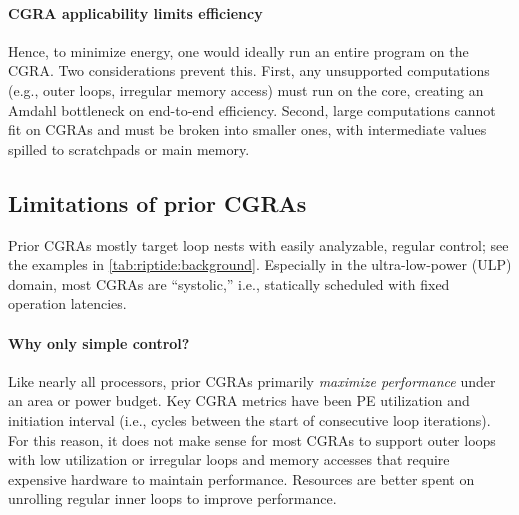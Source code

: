 
\paragraph{CGRA applicability limits efficiency}
Hence, to minimize energy, one would ideally run an entire program on the CGRA.
%
Two considerations prevent this.
%
First, any unsupported computations (e.g., outer loops, irregular memory access)
must run on the core, creating an Amdahl bottleneck on end-to-end
efficiency.
%
Second, large computations cannot fit on CGRAs and must be broken
into smaller ones, with intermediate values spilled to scratchpads or main memory.


\subsection{Limitations of prior CGRAs}

Prior CGRAs mostly target loop nests with easily analyzable, regular control;
see the examples in \autoref{tab:riptide:background}.
%
Especially in the ultra-low-power (ULP) domain, 
most CGRAs are ``systolic,'' i.e., statically
scheduled with fixed operation latencies.

\paragraph{Why only simple control?}
Like nearly all processors, prior CGRAs primarily \emph{maximize
performance} under an area or power budget.
%
Key CGRA metrics have been PE utilization and initiation interval
(i.e., cycles between the start of consecutive loop iterations).
%
For this reason, it does not make sense for most CGRAs to support
outer loops with low utilization
or irregular loops and memory accesses that require expensive hardware to maintain performance.
%
Resources are better spent on unrolling regular inner loops to improve performance. %

